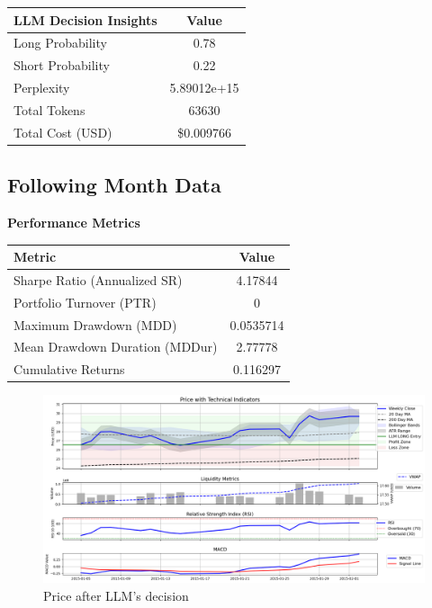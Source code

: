 \documentclass[8pt]{scrartcl}
\begin{document}
\begin{longtable}{l c}
\toprule
\textbf{LLM Decision Insights} & \textbf{Value} \\
\midrule
Long Probability & 0.78 \\
Short Probability & 0.22 \\
Perplexity & 5.89012e+15 \\
\midrule
Total Tokens & 63630 \\
Total Cost (USD) & \$0.009766 \\
\bottomrule
\end{longtable}

\subsection*{Following Month Data}

\textbf{Performance Metrics}

\begin{longtable}{l c}
\toprule
\textbf{Metric} & \textbf{Value} \\
\midrule
Sharpe Ratio (Annualized SR) & 4.17844 \\
Portfolio Turnover (PTR) & 0 \\
Maximum Drawdown (MDD) & 0.0535714 \\
Mean Drawdown Duration (MDDur) & 2.77778 \\
Cumulative Returns & 0.116297 \\
\bottomrule
\end{longtable}

\begin{figure}[H]
    \centering
    \includegraphics[width=1\linewidth]{judge_reviews/AAPL_M_gpt-4o-mini//2015-01-05/llm_Price_with_Technical_Indicators.png}
    \caption{Price after LLM's decision}
\end{figure}
\end{document}
